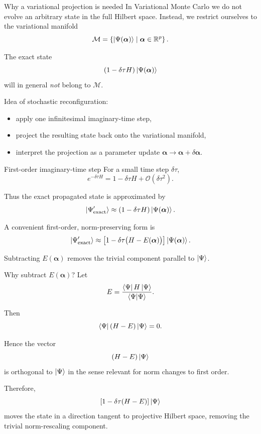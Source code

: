 \documentclass[aspectratio=169]{beamer}
\begin{document}
\begin{frame}{Why a variational projection is needed}
In Variational Monte Carlo we do not evolve an arbitrary state in the full Hilbert space.
Instead, we restrict ourselves to the variational manifold
\[
\mathcal{M}
=
\left\{
\ket{\Psi(\bm{\alpha})} \; \middle| \; \bm{\alpha}\in\mathbb{R}^p
\right\}.
\]

The exact state
\[
(1-\delta\tau H)\ket{\Psi(\bm{\alpha})}
\]
will in general \emph{not} belong to \(\mathcal{M}\).

\medskip

Idea of stochastic reconfiguration:
\begin{itemize}
\item apply one infinitesimal imaginary-time step,
\item project the resulting state back onto the variational manifold,
\item interpret the projection as a parameter update \(\bm{\alpha}\to \bm{\alpha}+\delta\bm{\alpha}\).
\end{itemize}
\end{frame}

\begin{frame}{First-order imaginary-time step}
For a small time step \(\delta\tau\),
\[
e^{-\delta\tau H}
=
1-\delta\tau H + \mathcal{O}(\delta\tau^2).
\]

Thus the exact propagated state is approximated by
\[
\ket{\Psi_{\mathrm{exact}}'}
\approx
(1-\delta\tau H)\ket{\Psi(\bm{\alpha})}.
\]

A convenient first-order, norm-preserving form is
\[
\ket{\Psi_{\mathrm{exact}}'}
\approx
\left[1-\delta\tau\bigl(H-E(\bm{\alpha})\bigr)\right]\ket{\Psi(\bm{\alpha})}.
\]

Subtracting \(E(\bm{\alpha})\) removes the trivial component parallel to \(\ket{\Psi}\).
\end{frame}

\begin{frame}{Why subtract \(E(\bm{\alpha})\)?}
Let
\[
E=\frac{\bra{\Psi}H\ket{\Psi}}{\braket{\Psi}{\Psi}}.
\]

Then
\[
\bra{\Psi}(H-E)\ket{\Psi}=0.
\]

Hence the vector
\[
(H-E)\ket{\Psi}
\]
is orthogonal to \(\ket{\Psi}\) in the sense relevant for norm changes to first order.

\medskip

Therefore,
\[
\left[1-\delta\tau(H-E)\right]\ket{\Psi}
\]
moves the state in a direction tangent to projective Hilbert space, removing the trivial norm-rescaling component.
\end{frame}
\end{document}
